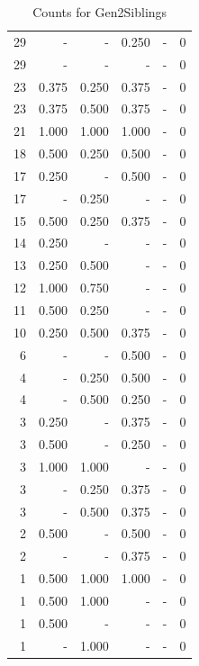 \documentclass[a4paper]{article}\usepackage[]{graphicx}\usepackage[]{color}
\begin{document}
\begin{table}[ht]
\begin{tabular}{rrrrrr}
   \rowcolor{sosoColor} 29 & - & - & 0.250 & - & 0 \\ 
   \rowcolor{nullColor} 29 & - & - & - & - & 0 \\ 
  23 & 0.375 & 0.250 & 0.375 & - & 0 \\ 
  23 & 0.375 & 0.500 & 0.375 & - & 0 \\ 
   \rowcolor{goodColor} 21 & 1.000 & 1.000 & 1.000 & - & 0 \\ 
   \rowcolor{badColor} 18 & 0.500 & 0.250 & 0.500 & - & 0 \\ 
   \rowcolor{sosoColor} 17 & 0.250 & - & 0.500 & - & 0 \\ 
  17 & - & 0.250 & - & - & 0 \\ 
  15 & 0.500 & 0.250 & 0.375 & - & 0 \\ 
   \rowcolor{nullColor} 14 & 0.250 & - & - & - & 0 \\ 
  13 & 0.250 & 0.500 & - & - & 0 \\ 
  12 & 1.000 & 0.750 & - & - & 0 \\ 
  11 & 0.500 & 0.250 & - & - & 0 \\ 
  10 & 0.250 & 0.500 & 0.375 & - & 0 \\ 
   \rowcolor{sosoColor} 6 & - & - & 0.500 & - & 0 \\ 
   \rowcolor{badColor} 4 & - & 0.250 & 0.500 & - & 0 \\ 
   \rowcolor{badColor} 4 & - & 0.500 & 0.250 & - & 0 \\ 
   \rowcolor{sosoColor} 3 & 0.250 & - & 0.375 & - & 0 \\ 
   \rowcolor{sosoColor} 3 & 0.500 & - & 0.250 & - & 0 \\ 
  3 & 1.000 & 1.000 & - & - & 0 \\ 
  3 & - & 0.250 & 0.375 & - & 0 \\ 
  3 & - & 0.500 & 0.375 & - & 0 \\ 
   \rowcolor{sosoColor} 2 & 0.500 & - & 0.500 & - & 0 \\ 
   \rowcolor{sosoColor} 2 & - & - & 0.375 & - & 0 \\ 
   \rowcolor{goodColor} 1 & 0.500 & 1.000 & 1.000 & - & 0 \\ 
  1 & 0.500 & 1.000 & - & - & 0 \\ 
   \rowcolor{nullColor} 1 & 0.500 & - & - & - & 0 \\ 
  1 & - & 1.000 & - & - & 0 \\ 
   \hline
\end{tabular}
\caption{Counts for Gen2Siblings} 
\end{table}
\end{document}
